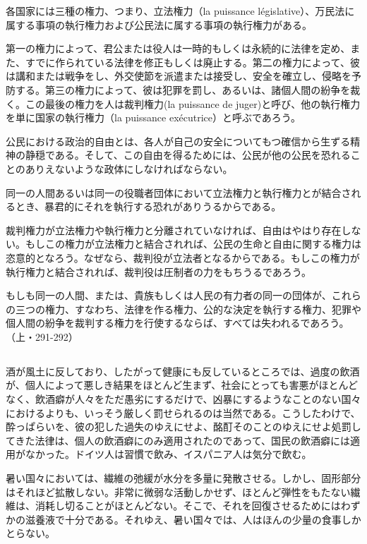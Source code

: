 各国家には三種の権力、つまり、立法権力（la puissance législative）、万民法に属する事項の執行権力および公民法に属する事項の執行権力がある。

第一の権力によって、君公または役人は一時的もしくは永続的に法律を定め、また、すでに作られている法律を修正もしくは廃止する。第二の権力によって、彼は講和または戦争をし、外交使節を派遣または接受し、安全を確立し、侵略を予防する。第三の権力によって、彼は犯罪を罰し、あるいは、諸個人間の紛争を裁く。この最後の権力を人は裁判権力(la puissance de juger)と呼び、他の執行権力を単に国家の執行権力（la puissance exécutrice）と呼ぶであろう。

公民における政治的自由とは、各人が自己の安全についてもつ確信から生ずる精神の静穏である。そして、この自由を得るためには、公民が他の公民を恐れることのありえないような政体にしなければならない。

同一の人間あるいは同一の役職者団体において立法権力と執行権力とが結合されるとき、暴君的にそれを執行する恐れがありうるからである。

裁判権力が立法権力や執行権力と分離されていなければ、自由はやはり存在しない。もしこの権力が立法権力と結合されれば、公民の生命と自由に関する権力は恣意的となろう。なぜなら、裁判役が立法者となるからである。もしこの権力が執行権力と結合されれば、裁判役は圧制者の力をもちうるであろう。

もしも同一の人間、または、貴族もしくは人民の有力者の同一の団体が、これらの三つの権力、すなわち、法律を作る権力、公的な決定を執行する権力、犯罪や個人間の紛争を裁判する権力を行使するならば、すべては失われるであろう。（上・291-292）

\subsection{}


酒が風土に反しており、したがって健康にも反しているところでは、過度の飲酒が、個人によって悪しき結果をほとんど生まず、社会にとっても害悪がほとんどなく、飲酒癖が人々をただ愚劣にするだけで、凶暴にするようなことのない国々におけるよりも、いっそう厳しく罰せられるのは当然である。こうしたわけで、酔っぱらいを、彼の犯した過失のゆえにせよ、酩酊そのことのゆえにせよ処罰してきた法律は、個人の飲酒癖にのみ適用されたのであって、国民の飲酒癖には適用がなかった。ドイツ人は習慣で飲み、イスパニア人は気分で飲む。

暑い国々においては、繊維の弛緩が水分を多量に発散させる。しかし、固形部分はそれほど拡散しない。非常に微弱な活動しかせず、ほとんど弾性をもたない繊維は、消耗し切ることがほとんどない。そこで、それを回復させるためにはわずかの滋養液で十分である。それゆえ、暑い国々では、人はほんの少量の食事しかとらない。

